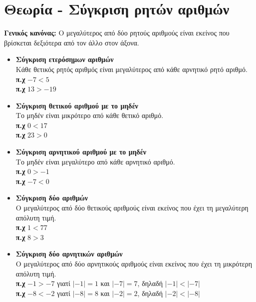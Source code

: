 \documentclass[a4paper,10pt]{report}
\begin{document}
\section*{Θεωρία - Σύγκριση ρητών αριθμών\hfill \small{}}
\textbf{Γενικός κανόνας:} Ο μεγαλύτερος από δύο ρητούς αριθμούς είναι εκείνος που βρίσκεται δεξιότερα 
από τον άλλο στον άξονα.
\begin{itemize}
 \item \textbf{Σύγκριση ετερόσημων αριθμών} \\ 
       Κάθε θετικός ρητός αριθμός είναι μεγαλύτερος από κάθε αρνητικό ρητό αριθμό.\\
       \textbf{π.χ} $-7<5$\\
       \textbf{π.χ} $13>-19$
 \item \textbf{Σύγκριση θετικού αριθμού με το μηδέν} \\ 
       Το μηδέν είναι μικρότερο από κάθε θετικό αριθμό.\\
       \textbf{π.χ} $0<17$\\
       \textbf{π.χ} $23>0$
 \item \textbf{Σύγκριση αρνητικού αριθμού με το μηδέν} \\ 
       Το μηδέν είναι μεγαλύτερο από κάθε αρνητικό αριθμό.\\
       \textbf{π.χ} $0>-1$\\
       \textbf{π.χ} $-7<0$
 \item \textbf{Σύγκριση δύο αριθμών} \\ 
       Ο μεγαλύτερος από δύο θετικούς αριθμούς είναι εκείνος που έχει τη μεγαλύτερη απόλυτη τιμή.\\
       \textbf{π.χ} $1<77$\\
       \textbf{π.χ} $8>3$
 \item \textbf{Σύγκριση δύο αρνητικών αριθμών} \\ 
       Ο μεγαλύτερος από δύο αρνητικούς αριθμούς είναι εκείνος που έχει τη μικρότερη απόλυτη τιμή.\\
       \textbf{π.χ} $-1>-7$ γιατί $|-1|=1$ και $|-7|=7$, δηλαδή $|-1|<|-7|$\\
       \textbf{π.χ} $-8<-2$ γιατί $|-8|=8$ και $|-2|=2$, δηλαδή $|-2|<|-8|$      
\end{itemize}
\end{document}
